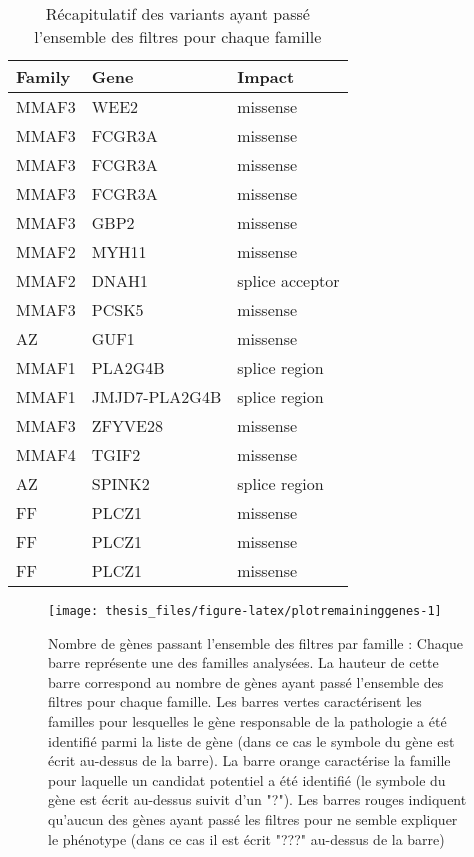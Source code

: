 \documentclass[12pt,twoside]{reedthesis}
\theoremstyle{definition}
\theoremstyle{definition}
\theoremstyle{remark}
\begin{document}
  \begin{longtable}[t]{lll}
  \caption{\label{tab:tablegene}Récapitulatif des variants ayant passé l'ensemble des filtres pour chaque famille}\\
  \toprule
  Family & Gene & Impact\\
  \midrule
  MMAF3 & WEE2 & missense\\
  MMAF3 & FCGR3A & missense\\
  MMAF3 & FCGR3A & missense\\
  MMAF3 & FCGR3A & missense\\
  MMAF3 & GBP2 & missense\\
  \addlinespace
  MMAF2 & MYH11 & missense\\
  MMAF2 & DNAH1 & splice acceptor\\
  MMAF3 & PCSK5 & missense\\
  AZ & GUF1 & missense\\
  MMAF1 & PLA2G4B & splice region\\
  \addlinespace
  MMAF1 & JMJD7-PLA2G4B & splice region\\
  MMAF3 & ZFYVE28 & missense\\
  MMAF4 & TGIF2 & missense\\
  AZ & SPINK2 & splice region\\
  FF & PLCZ1 & missense\\
  \addlinespace
  FF & PLCZ1 & missense\\
  FF & PLCZ1 & missense\\
  \bottomrule
  \end{longtable}
  
  \begin{figure}
  
  {\centering \texttt{[image: thesis\_files/figure-latex/plotremaininggenes-1]} 
  
  }
  
  \caption[Nombre de gènes passant l'ensemble des filtres par famille]{Nombre de gènes passant l'ensemble des filtres par famille  :  Chaque barre représente une des familles analysées. La hauteur de cette barre correspond au nombre de gènes ayant passé l'ensemble des filtres pour chaque famille. Les barres vertes caractérisent les familles pour lesquelles le gène responsable de la pathologie a été identifié parmi la liste de gène (dans ce cas le symbole du gène est écrit au-dessus de la barre). La barre orange caractérise la famille pour laquelle un candidat potentiel a été identifié (le symbole du gène est écrit au-dessus suivit d'un "?"). Les barres rouges indiquent qu'aucun des gènes ayant passé les filtres pour ne semble expliquer le phénotype (dans ce cas il est écrit "???" au-dessus de la barre)}\label{fig:plotremaininggenes}
  \end{figure}
  
\end{document}
